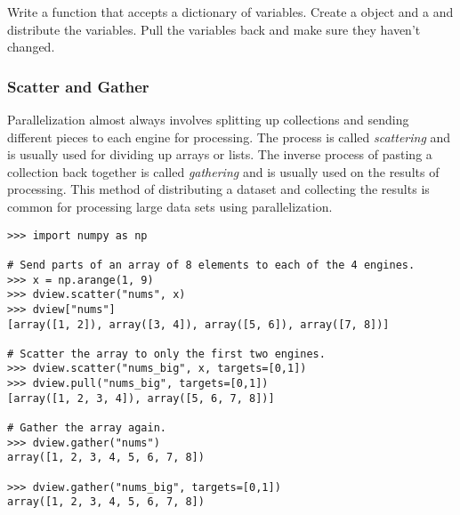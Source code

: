 %

\begin{problem}
Write a function  that accepts a dictionary of variables.
Create a  object and a  and distribute the variables.
Pull the variables back and make sure they haven't changed.
\end{problem}

\subsubsection*{Scatter and Gather} %

Parallelization almost always involves splitting up collections and sending different pieces to each engine for processing.
The process is called \emph{scattering} and is usually used for dividing up arrays or lists.
The inverse process of pasting a collection back together is called \emph{gathering} and is usually used on the results of processing.
This method of distributing a dataset and collecting the results is common for processing large data sets using parallelization.

\begin{lstlisting}
>>> import numpy as np

# Send parts of an array of 8 elements to each of the 4 engines.
>>> x = np.arange(1, 9)
>>> dview.scatter("nums", x)
>>> dview["nums"]
[array([1, 2]), array([3, 4]), array([5, 6]), array([7, 8])]

# Scatter the array to only the first two engines.
>>> dview.scatter("nums_big", x, targets=[0,1])
>>> dview.pull("nums_big", targets=[0,1])
[array([1, 2, 3, 4]), array([5, 6, 7, 8])]

# Gather the array again.
>>> dview.gather("nums")
array([1, 2, 3, 4, 5, 6, 7, 8])

>>> dview.gather("nums_big", targets=[0,1])
array([1, 2, 3, 4, 5, 6, 7, 8])
\end{lstlisting}


